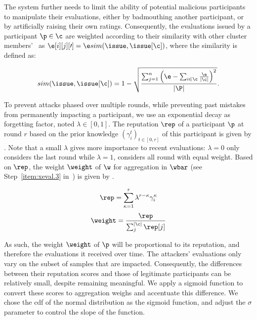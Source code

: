 The system further needs to limit the ability of potential malicious participants to manipulate their evaluations, either by badmouthing another participant, or by artificially raising their own ratings.
Consequently, the evaluations issued by a participant $\p \in \c$ are weighted according to their similarity with other cluster members'~\cite{xiong_PeerTrustsupportingreputationbased_2004} as $\e[i][j][\prime] = \e sim(\issue,\issue[\c])$, where the similarity is defined as:

\begin{equation}\label{eq:sim_reput}
  sim(\issue,\issue[\c]) = 1 - \sqrt{
    \frac{
      \sum_{j=1}^{n}{
        {\left(\e - \sum_{i \in \c} \frac{\e}{|\c|}\right)}^{2}
      }
    }
    {
      |\P|
    }
  }.
\end{equation}


To prevent attacks phased over multiple rounds, while preventing past mistakes from permanently impacting a participant, we use an exponential decay as forgetting factor, noted $\lambda \in [0,1]$. The reputation $\rep$ of a participant $\p$ at round $r$ based on the prior knowledge $(\gamma^t_i)_{t\in[0,r]}$ of this participant is given by .
Note that a small $\lambda$ gives more importance to recent evaluations: $\lambda=0$ only considers the last round while $\lambda=1$, considers all round with equal weight.  
Based on $\rep$, the weight $\weight$ of $\w$ for aggregation in $\wbar$ (see Step~\ref{item:xeval.3} in~) is given by .

\begin{multicols}{2}
  \begin{equation}\label{eq:reputation_history}
    \rep = \sum_{\kappa=1}^{r}\lambda^{r-\kappa}\gamma_i^{\kappa}
  \end{equation}\break
  \begin{equation}\label{eq:weight_computation}
    \weight = \frac{\rep}{\sum_{j}^{|\c|}\rep[j]}
  \end{equation}
\end{multicols}

As such, the weight $\weight$ of $\p$ will be proportional to its reputation, and therefore the evaluations it received over time.
The attackers' evaluations only vary on the subset of samples that are impacted. 
Consequently, the differences between their reputation scores and those of legitimate participants can be relatively small, despite remaining meaningful. 
We apply a sigmoid function to convert these scores to aggregation weighs and accentuate this difference.
We chose the \gls{cdf} of the normal distribution as the sigmoid function, and adjust the $\sigma$ parameter to control the slope of the function.